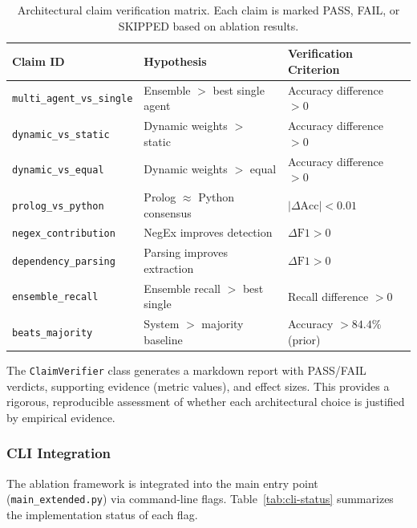 \documentclass[12pt]{article}
\begin{document}
\begin{table}[ht]
\centering
\small
\begin{tabular}{lll}
\toprule
\textbf{Claim ID} & \textbf{Hypothesis} & \textbf{Verification Criterion} \\
\midrule
\texttt{multi\_agent\_vs\_single} & Ensemble $>$ best single agent & Accuracy difference $> 0$ \\
\texttt{dynamic\_vs\_static} & Dynamic weights $>$ static & Accuracy difference $> 0$ \\
\texttt{dynamic\_vs\_equal} & Dynamic weights $>$ equal & Accuracy difference $> 0$ \\
\texttt{prolog\_vs\_python} & Prolog $\approx$ Python consensus & $|\Delta\text{Acc}| < 0.01$ \\
\texttt{negex\_contribution} & NegEx improves detection & $\Delta\text{F1} > 0$ \\
\texttt{dependency\_parsing} & Parsing improves extraction & $\Delta\text{F1} > 0$ \\
\texttt{ensemble\_recall} & Ensemble recall $>$ best single & Recall difference $> 0$ \\
\texttt{beats\_majority} & System $>$ majority baseline & Accuracy $> 84.4\%$ (prior) \\
\bottomrule
\end{tabular}
\caption{Architectural claim verification matrix. Each claim is marked PASS, FAIL, or SKIPPED based on ablation results.}
\label{tab:claims}
\end{table}

The \texttt{ClaimVerifier} class generates a markdown report with PASS/FAIL verdicts, supporting evidence (metric values), and effect sizes. This provides a rigorous, reproducible assessment of whether each architectural choice is justified by empirical evidence.

\subsubsection{CLI Integration}

The ablation framework is integrated into the main entry point (\texttt{main\_extended.py}) via command-line flags. Table~\ref{tab:cli-status} summarizes the implementation status of each flag.
\end{document}
